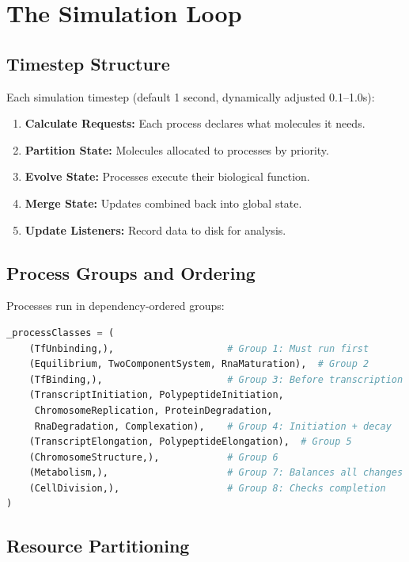 \documentclass[11pt,a4paper]{report}
\begin{document}
\section{The Simulation Loop}

\subsection{Timestep Structure}

Each simulation timestep (default 1 second, dynamically adjusted 0.1--1.0s):

\begin{enumerate}
    \item \textbf{Calculate Requests:} Each process declares what molecules it needs.
    \item \textbf{Partition State:} Molecules allocated to processes by priority.
    \item \textbf{Evolve State:} Processes execute their biological function.
    \item \textbf{Merge State:} Updates combined back into global state.
    \item \textbf{Update Listeners:} Record data to disk for analysis.
\end{enumerate}

\subsection{Process Groups and Ordering}

Processes run in dependency-ordered groups:

\begin{lstlisting}[language=Python]
_processClasses = (
    (TfUnbinding,),                    # Group 1: Must run first
    (Equilibrium, TwoComponentSystem, RnaMaturation),  # Group 2
    (TfBinding,),                      # Group 3: Before transcription
    (TranscriptInitiation, PolypeptideInitiation, 
     ChromosomeReplication, ProteinDegradation,
     RnaDegradation, Complexation),    # Group 4: Initiation + decay
    (TranscriptElongation, PolypeptideElongation),  # Group 5
    (ChromosomeStructure,),            # Group 6
    (Metabolism,),                     # Group 7: Balances all changes
    (CellDivision,),                   # Group 8: Checks completion
)
\end{lstlisting}

\subsection{Resource Partitioning}
\end{document}
